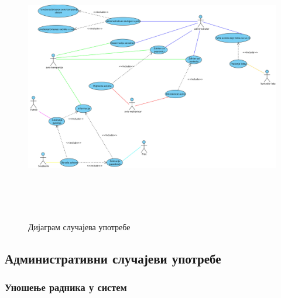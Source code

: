 \documentclass{article}
\begin{document}
\begin{figure}[H]
\centering
\includegraphics[width=1\textwidth, height=12cm]{Dijagrami_slike/uc_diagram.jpg}
\caption{\label{fig:uc_diagram}Дијаграм случајева употребе}
\end{figure}

\subsection{Административни случајеви употребе}

\subsubsection{Уношење радника у систем}
\end{document}
